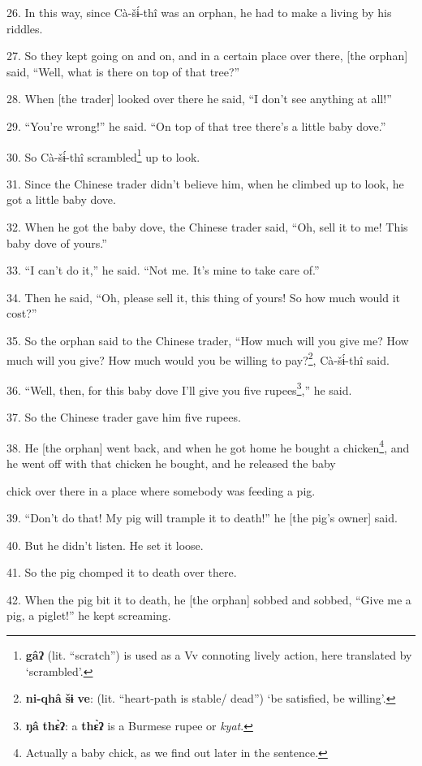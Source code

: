 26. In this way, since Cà-šɨ́-thî was an orphan, he had to make a living by
his riddles.

27. So they kept going on and on, and in a certain place over there, [the orphan]
said, ``Well, what is there on top of that tree?''

28. When [the trader] looked over there he said, ``I don't see anything at all!''

29. ``You're wrong!'' he said. ``On top of that tree there's a little baby dove.''

30. So Cà-šɨ́-thî scrambled\footnote{\textbf{gâʔ} (lit. ``scratch'') is used as a Vv connoting lively action, here translated by `scrambled'.} up to look.

31. Since the Chinese trader didn't believe him, when he climbed up to look, he
got a little baby dove.

32. When he got the baby dove, the Chinese trader said, ``Oh, sell it to me! This
baby dove of yours.''

33. ``I can't do it,'' he said. ``Not me. It's mine to take care of.''

34. Then he said, ``Oh, please sell it, this thing of yours! So how much would
it cost?''

35. So the orphan said to the Chinese trader, ``How much will you give me? How much
will you give? How much would you be willing to pay?\footnote{\textbf{ni-qhâ} \textbf{šɨ} \textbf{ve}: (lit. ``heart-path is stable/ dead'') `be satisfied, be willing'.}, Cà-šɨ́-thî said.

36. ``Well, then, for this baby dove I'll give you five rupees\footnote{\textbf{ŋâ} \textbf{thɛ̀ʔ}: a \textbf{thɛ̀ʔ} is a Burmese rupee or \textit{kyat}.},'' he said.

37. So the Chinese trader gave him five rupees.

38. He [the orphan] went back, and when he got home he bought a chicken\footnote{Actually a baby chick, as we find out later in the sentence.}, and
he went off with that chicken he bought, and he released the baby

chick over there in a place where somebody was feeding a pig.

39. ``Don't do that! My pig will trample it to death!'' he [the pig's owner] said.

40. But he didn't listen. He set it loose.

41. So the pig chomped it to death over there.

42. When the pig bit it to death, he [the orphan] sobbed and sobbed, ``Give me
a pig, a piglet!'' he kept screaming.

